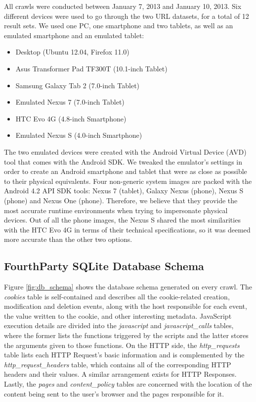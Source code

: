 \documentclass{acm_proc_article-sp}
\begin{document}
All crawls were conducted between January 7, 2013 and January 10, 2013. Six different devices were used to go through the two URL datasets, for a total of 12 result sets. We used one PC, one smartphone and two tablets, as well as an emulated smartphone and an emulated tablet:
\vspace{-1em}
\begin{itemize}\itemsep0em 
\item Desktop (Ubuntu 12.04, Firefox 11.0)

\item Asus Transformer Pad TF300T (10.1-inch Tablet)

\item Samsung Galaxy Tab 2 (7.0-inch Tablet)

\item Emulated Nexus 7 (7.0-inch Tablet)

\item HTC Evo 4G (4.8-inch Smartphone)

\item Emulated Nexus S (4.0-inch Smartphone)
\end{itemize}

The two emulated devices were created with the Android Virtual Device (AVD) tool that comes with the Android SDK. We tweaked the emulator's settings in order to create an Android smartphone and tablet that were as close as possible to their physical equivalents. Four non-generic system images are packed with the Android 4.2 API SDK tools: Nexus 7 (tablet), Galaxy Nexus (phone), Nexus S (phone) and Nexus One (phone).  Therefore, we believe that they provide the most accurate runtime environments when trying to impersonate physical devices. Out of all the phone images, the Nexus S shared the most similarities with the HTC Evo 4G in terms of their technical specifications, so it was deemed more accurate than the other two options.

\subsection{FourthParty SQLite Database Schema}
Figure \ref{fig:db_schema} shows the database schema generated on every crawl. The \emph{cookies} table is self-contained and describes all the cookie-related creation, modification and deletion events, along with the host responsible for each event, the value written to the cookie, and other interesting metadata. JavaScript execution details are divided into the \emph{javascript} and \emph{javascript\_calls} tables, where the former lists the functions triggered by the scripts and the latter stores the arguments given to those functions. On the HTTP side, the \emph{http\_requests} table lists each HTTP Request's basic information and is complemented by the \emph{http\_request\_headers} table, which contains all of the corresponding HTTP headers and their values. A similar arrangement exists for HTTP Responses. Lastly, the \emph{pages} and \emph{content\_policy} tables are concerned with the location of the content being sent to the user's browser and the pages responsible for it.
\end{document}
